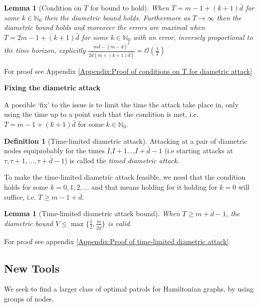 \documentclass[a4paper,10pt]{article}
\newtheorem{lemma}[theorem]{Lemma}
\theoremstyle{definition}
\newtheorem{definition}[theorem]{Definition}
\theoremstyle{definition}
\theoremstyle{remark}
\theoremstyle{definition}
\begin{document}
\begin{lemma}[Condition on $T$ for bound to hold]
\label{Lemma:Condition on time horizon for diametric bound to hold}
When $T=m-1+(k+1)\bar{d}$ for some $k \in \mathbb{N}_{0}$ then the diametric bound holds. Furthermore as $T \rightarrow \infty$ then the diametric bound holds and moreover the errors are maximal when $T=2m-1+(k+1)\bar{d}$ for some $k \in \mathbb{N}_{0}$ with an error, inversely proportional to the time horizon, explicitly $\frac{m\bar{d}-(m-\bar{d})^{2}}{2\bar{d}(m+(k+1)\bar{d})}=\mathcal{O}(\frac{1}{T})$
\end{lemma}

For proof see Appendix \ref{Appendix:Proof of conditions on T for diametric attack}

\begin{myfigure}

%
\caption{Best Upper Bound achievable under the diametric strategy}
\label{Figure:Example of upper bound achieved by diametric attack}
\end{myfigure}

\textbf{Fixing the diametric attack}

A possible `fix' to the issue is to limit the time the attack take place in, only using the time up to a point such that the condition is met, i.e. $T=m-1+(k+1)\bar{d}$ for some $k \in \mathbb{N}_{0}$.

\begin{definition}[Time-limited diametric attack]
Attacking at a pair of diametric nodes equiprobably for the times $I$,$I+1$...,$I+\bar{d}-1$ (i.e starting attacks at $\tau,\tau+1,...,\tau+\bar{d}-1$) is called the \textit{timed diametric attack}.
\end{definition}

To make the time-limited diametric attack feasible, we need that the condition holds for some $k=0,1,2,...$ and that means holding for it holding for $k=0$ will suffice, i.e. $T \geq m-1+\bar{d}$.

\begin{lemma}[Time-limited diametric attack bound]
When $T \geq m+ \bar{d}-1$, the diametric bound $V \leq \max\{\frac{1}{2},\frac{m}{2\bar{d}}\}$ is valid.
\end{lemma}

For proof see appendix \ref{Appendix:Proof of time-limited diametric attack}

\subsection{New Tools}
We seek to find a larger class of optimal patrols for Hamiltonian graphs, by using groups of nodes.
\end{document}
